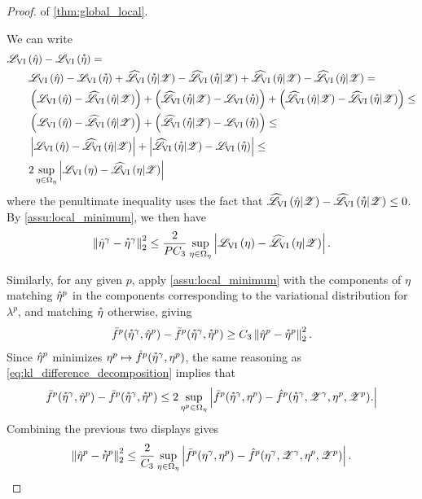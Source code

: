 

\begin{proof} of \cref{thm:global_local}.

We can write
%
\begin{align}
%
\MoveEqLeft
\klfullobj{\etahat} - \klfullobj{\etastar}  ={}
\nonumber\\&
\klfullobj{\etahat} - \klfullobj{\etastar}   %
+ \klobj{\etastar | \Z} - \klobj{\etastar | \Z} + %
\klobj{\etahat | \Z} - \klobj{\etahat | \Z} = %
\nonumber\\&
\left(\klfullobj{\etahat} - \klobj{\etahat | \Z} \right) +
\left(\klobj{\etastar | \Z}  - \klfullobj{\etastar} \right) +
\left(\klobj{\etahat | \Z} - \klobj{\etastar | \Z}\right) \le
\nonumber\\&
\left(\klfullobj{\etahat} - \klobj{\etahat | \Z} \right) +
\left(\klobj{\etastar | \Z}  - \klfullobj{\etastar} \right) \le
\nonumber\\&
\abs{\klfullobj{\etahat} - \klobj{\etahat | \Z}} +
\abs{\klobj{\etastar | \Z}  - \klfullobj{\etastar}} \le
\nonumber\\&
2 \sup_{\eta \in \etadom} \abs{\klfullobj{\eta} - \klobj{\eta | \Z}}
\label{eq:kl_difference_decomposition}
%
\end{align}
%
where the penultimate inequality uses the fact that $\widehat{\mathscr{L}}_{\mathrm{VI}}\left(\hat{\eta} | \mathscr{Z}\right) -
\widehat{\mathscr{L}}_{\mathrm{VI}}\left(\accentset{*}{\eta} | \mathscr{Z}\right) \le 0$.
%
By \cref{assu:local_minimum}, we then have
%
\begin{align}
%
\norm{\etahat^\gamma - \etastar^\gamma}_2^2 \le
\frac{2}{P C_3} \sup_{\eta \in \etadom}
    \abs{ \klfullobj{\eta} - \klobj{\eta | \Z}}.
    \label{eq:etagamma_strict_min}
%
\end{align}

Similarly, for any given $p$, apply \cref{assu:local_minimum} with the
components of $\eta$ matching $\hat{\eta}^p$ in the components corresponding
to the variational distribution for $\lambda^p$, and matching $\accentset{*}{\eta}$
otherwise, giving
%
\begin{align}\label{eq:etap_strict_min}
%
\fbar^p(\etastar^\gamma, \etahat^p) -
    \fbar^p(\etastar^\gamma, \etastar^p)
    \ge C_3 \norm{\etahat^p - \etastar^p}_2^2.
%
\end{align}
%
Since $\hat{\eta}^p$ minimizes $\eta^p \mapsto \hat{f}^p(\accentset{*}{\eta}^\gamma, \eta^p)$,
the same reasoning as \cref{eq:kl_difference_decomposition} implies that
%
\begin{align*}
%
\fbar^p(\etastar^\gamma, \etahat^p) - \fbar^p(\etastar^\gamma, \etastar^p)
\le 2 \sup_{\eta^p \in \etadom}
    \abs{\fbar^p(\etastar^\gamma, \eta^p) -
         \fhat^p(\etastar^\gamma, \Z^\gamma, \eta^p, \Z^p).
}
%
\end{align*}
%
Combining the previous two displays gives
%
\begin{align*}
%
\norm{\etahat^p - \etastar^p}_2^2 \le
\frac{2}{C_3} \sup_{\eta \in \etadom}
    \abs{ \fbar^p(\eta^\gamma, \eta^p) -
          \fhat^p(\eta^\gamma, \Z^\gamma, \eta^p, \Z^p)}.
%
\end{align*}


\end{proof}
